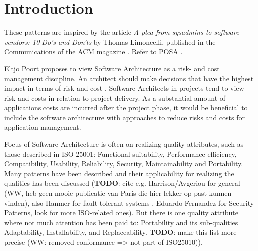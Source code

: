 \section{Introduction} These patterns are inspired by the article \textit{A plea from sysadmins to software vendors: 10 Do's and Don'ts} by Thomas Limoncelli, published in the Communications of the ACM magazine \cite{Limoncelli2011a}. Refer to POSA \cite{Buschmann1996}. 

Eltjo Poort proposes to view Software Architecture as a risk- and cost management discipline.  An architect should make decisions that have the highest impact in terms of risk and cost \cite{Poort2011}. Software Architects in projects tend to view risk and costs in relation to project delivery.  As a substantial amount of applications costs are incurred after the project phase, it would be beneficial to include the software architecture with approaches to reduce risks and costs for application management. 

Focus of Software Architecture is often on realizing quality attributes, such as those described in ISO 25001: Functional suitability, Performance efficiency, Compatibility, Usability, Reliability, Security, Maintainability and Portability. Many patterns have been described and their applicability for realizing the qualities has been discussed (\textbf{TODO}: cite e.g. Harrison/Avgeriou for general (WW, heb geen mooie publicatie van Paris die hier lekker op past kunnen vinden), also Hanmer for fault tolerant systems \cite{Hanmer2007}, Eduardo Fernandez for Security Patterns, look for more ISO-related ones). But there is one quality attribute where not much attention has been paid to: Portability and its sub-qualities Adaptability, Installability, and Replaceability. \textbf{TODO}: make this list more precise (WW: removed conformance => not part of ISO25010)).

